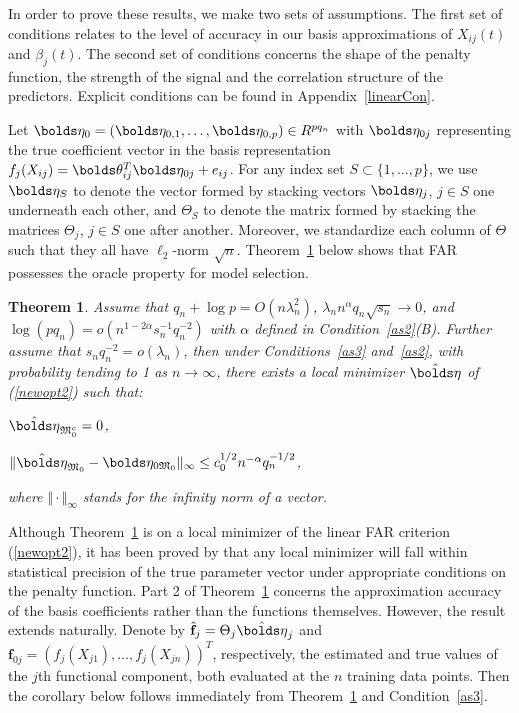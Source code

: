 \documentclass[aos,MSNbibl,dvips]{arximspdf}
\newcommand{\rrVert}{\Vert}
\newcommand{\llVert}{\Vert}
\newtheorem{theorem}{Theorem}
\newcommand{\btheta}{\bolds\theta}
\newcommand{\bfeta}{\bolds\eta}
\newcommand{\bff}{{\mathbf f}}
\newcommand{\hbfeta}{\hat{\bfeta}}
\newcommand{\Mfrak}{\mathfrak{M}}
\begin{document}
In order to prove these results, we make two sets of assumptions. The
first set of conditions relates to the level of accuracy in our basis
approximations of $X_{ij}(t)$ and
$\beta_j(t)$. The second set of conditions concerns the shape of the
penalty function, the strength of the signal and the correlation
structure of the predictors. Explicit conditions %
can be found in Appendix~\ref{linearCon}.

Let $\bfeta_0 =
(\bfeta_{0,1}, \ldots, \bfeta_{0,p}) \in R^{pq_n}$ with $\bfeta
_{0j}$ representing the true coefficient vector in the basis
representation $f_j(X_{ij}) = \btheta_{ij}^T\bfeta_{0j} + e_{ij}$.
For\vspace*{1pt} any index set $S \subset\{1,\ldots, p\}$, we use $\bfeta_S$ to
denote the vector formed by stacking vectors $\bfeta_j$, $j\in S$ one
underneath each other, and
$\Theta_S$ to denote the matrix formed by stacking the matrices
$\Theta_j$, $j\in S$ one after another. Moreover, we standardize each
column of $\Theta$ such that they all have $\ell_2$-norm $\sqrt{n}$.
Theorem~\ref{T2} below shows that FAR possesses the oracle property
for model selection.

\begin{theorem}\label{T2} Assume that $q_n + \log p = O(n\lambda_n^2)
$, $\lambda_n n^{\alpha}q_n\sqrt{s_n} \rightarrow0$, and $\log
(pq_n) = o(n^{1-2\alpha}s_n^{-1}q_n^{-2})$ with $\alpha$ defined in
Condition~\ref{as2}\textup{(B)}. Further assume that $s_nq_n^{-2} = o(\lambda
_n)$, then under Conditions~\ref{as3} and~\ref{as2}, with probability
tending to 1 as $ n
\rightarrow\infty$, there exists a local minimizer $\hbfeta$ of
(\ref{newopt2}) such that:
%
\begin{longlist}[(2)]
%
\item[(1)] $\hbfeta_{\Mfrak_0^c}=0$,
%
\item[(2)] $\llVert \hbfeta_{\Mfrak_0} - \bfeta_{0\Mfrak_0}\rrVert
_\infty\leq
c_0^{1/2}n^{-\alpha}q_n^{-1/2}$,
\end{longlist}
%
where $\llVert \cdot\rrVert _\infty$ stands for the infinity norm of
a vector.
\end{theorem}

Although Theorem~\ref{T2} is on a local minimizer of the linear FAR
criterion (\ref{newopt2}), it has been proved by \cite{loh13} that
any local minimizer will fall within statistical precision of the true
parameter vector under appropriate conditions on the penalty function.
Part 2 of Theorem~\ref{T2} concerns the approximation accuracy of the
basis coefficients rather than the functions themselves. However, the
result extends naturally.
Denote by $\hat\bff_j = \Theta_j\hbfeta_j$ and $\bff_{0j} =
(f_j(X_{j1}), \ldots, f_j(X_{jn}))^T$, respectively, the estimated and
true values of the $j$th functional
component, both evaluated at the $n$ training data points. Then the
corollary below follows immediately from Theorem~\ref{T2} and
Condition~\ref{as3}.
\end{document}
